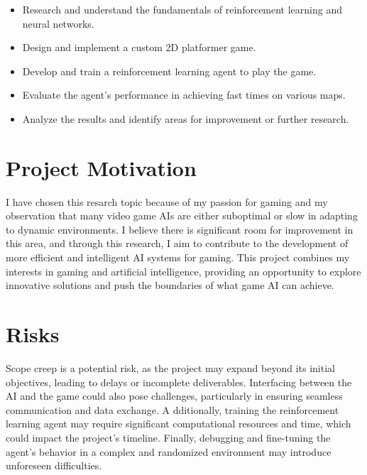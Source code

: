 \begin{itemize}
    \item Research and understand the fundamentals of reinforcement learning and neural networks.
    \item Design and implement a custom 2D platformer game.
    \item Develop and train a reinforcement learning agent to play the game.
    \item Evaluate the agent's performance in achieving fast times on various maps.
    \item Analyze the results and identify areas for improvement or further research.
\end{itemize}

\section{Project Motivation}

I have chosen this resarch topic because of my passion for gaming and my observation that many video game AIs are either suboptimal or slow in adapting to dynamic environments. 
I believe there is significant room for improvement in this area, and through this research, I aim to contribute to the development of more efficient and intelligent AI systems for gaming. 
This project combines my interests in gaming and artificial intelligence, providing an opportunity to explore innovative solutions and push the boundaries of what game AI can achieve.

\section{Risks}

Scope creep is a potential risk, as the project may expand beyond its initial objectives, leading to delays or incomplete deliverables. 
Interfacing between the AI and the game could also pose challenges, particularly in ensuring seamless communication and data exchange. A
dditionally, training the reinforcement learning agent may require significant computational resources and time, which could impact the project's timeline. 
Finally, debugging and fine-tuning the agent's behavior in a complex and randomized environment may introduce unforeseen difficulties.